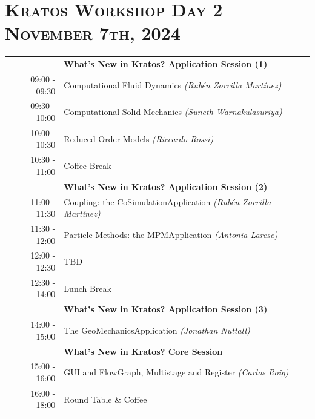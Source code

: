 \documentclass{article}
\begin{document}
\newpage
\section*{\centering \textsc{Kratos Workshop Day 2 -- November 7th, 2024}}

\begin{table}[h]\centering
   \begin{tabularx}{0.85\textwidth}{r|X}
      \toprule%
                    & {\large \textbf{What's New in Kratos? Application Session (1)}} \\%
      09:00 - 09:30 & Computational Fluid Dynamics \textit{(Rubén Zorrilla Martínez)}\\%
      09:30 - 10:00 & Computational Solid Mechanics \textit{(Suneth Warnakulasuriya)}\\%
      10:00 - 10:30 & Reduced Order Models \textit{(Riccardo Rossi)}\\%
      \midrule%
      \rowcolor{SeaGreen3!5!} 10:30 - 11:00 & Coffee Break \\%
      \midrule%
                    & {\large \textbf{What's New in Kratos? Application Session (2)}} \\%
      11:00 - 11:30 & Coupling: the CoSimulationApplication \textit{(Rubén Zorrilla Martínez)}\\%
      11:30 - 12:00 & Particle Methods: the MPMApplication \textit{(Antonia Larese)}\\%
      12:00 - 12:30 & TBD \\%
      \midrule%
      \rowcolor{SeaGreen3!5!} 12:30 - 14:00 & Lunch Break \\%
      \midrule%
                    & {\large \textbf{What's New in Kratos? Application Session (3)}} \\%
      14:00 - 15:00 & The GeoMechanicsApplication \textit{(Jonathan Nuttall)}\\%
      \midrule%
                    & {\large \textbf{What's New in Kratos? Core Session}} \\%
      15:00 - 16:00 & GUI and FlowGraph, Multistage and Register \textit{(Carlos Roig)}\\%
      \midrule%
      16:00 - 18:00 & Round Table \& Coffee \\%
      \bottomrule
   \end{tabularx}
\end{table}
\end{document}
